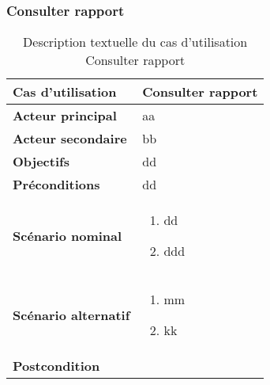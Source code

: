         \subsubsection[Consulter rapport]{Consulter rapport}
        \begin{longtable}{p{4cm} p{9cm}}
            \caption{Description textuelle du cas d’utilisation Consulter rapport}
            \label{table:usecaseConsulterRapport}
            \\\hline\hline
                \textbf{Cas d’utilisation} & \textbf{Consulter rapport}
            \\\hline\hline
                    \textbf{Acteur principal} & aa
                \\
                    \textbf{Acteur secondaire} & bb
                \\
                    \textbf{Objectifs} & dd
                \\
                    \textbf{Préconditions} & dd
                \\
                \textbf{Scénario nominal} &
                    \begin{enumerate}[leftmargin=*]
                        \item dd
                        \item ddd
                    \end{enumerate}
                \\
                \textbf{Scénario alternatif} &
                    \begin{enumerate}[leftmargin=*]
                        \item mm
                        \item kk
                    \end{enumerate}
                \\
                \textbf{Postcondition}
            \\\bottomrule
        \end{longtable}
\pagebreak

